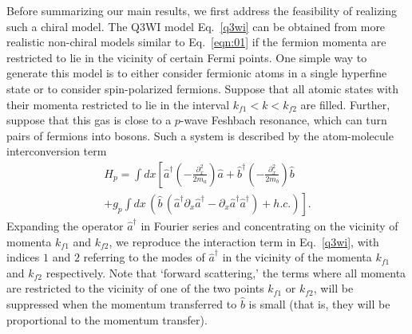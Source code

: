 \documentclass[aps,pra,
superscriptaddress,
reprint,twocolumn,preprintnumbers,
amsmath,amssymb,
nofootinbib]{revtex4-1}
\begin{document}
Before summarizing our main results, we first address the feasibility of realizing such a chiral model. The Q3WI model Eq.~\eqref{q3wi} can be obtained from more realistic non-chiral models similar to Eq.~\eqref{eqn:01} if the fermion momenta are restricted to lie in the vicinity of certain Fermi points. 
One simple way to generate this model is to either consider fermionic atoms in a single hyperfine state or to consider spin-polarized fermions. Suppose that all atomic states with their momenta restricted to lie in the interval $k_{f1} < k < k_{f2}$ are filled. Further, suppose that this gas is close to a $p$-wave Feshbach resonance, which can turn pairs of fermions into bosons. Such a system is described by the atom-molecule interconversion term
\begin{align}
H_p = \int dx \left[ \hat a^\dagger \left(- \frac{\partial^2_x}{2m_a}\right) \hat a + \hat b^\dagger \left(- \frac{\partial^2_x}{2m_b} \right) \hat b  \right. \nonumber\\
 \left. + g_p \int dx \, \left( \hat b \, \left( \hat a^\dagger \partial_x \hat a^\dagger  -  \partial_x \hat a^\dagger  \hat a^\dagger \right) + h. c. \right) \right].
\end{align}
Expanding the operator $\hat a^\dagger$ in Fourier series and concentrating on the vicinity of momenta $k_{f1}$ and $k_{f2}$, we reproduce the 
interaction term in Eq.~\eqref{q3wi}, with indices $1$ and $2$ referring to the modes of $\hat a^\dagger$ in the vicinity of the momenta $k_{f1}$ and $k_{f2}$ respectively. Note that `forward scattering,' the terms where all momenta are restricted to the vicinity of one of the two points $k_{f1}$ or $k_{f2}$, will be suppressed when the momentum  transferred to $\hat b$ is small (that is, they will be proportional to the momentum transfer). 
\end{document}
